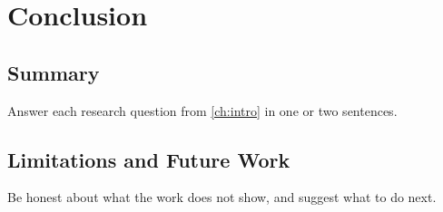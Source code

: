 \chapter{Conclusion}\label{ch:conclusion}

\section{Summary}
Answer each research question from \cref{ch:intro} in one or two sentences.

\section{Limitations and Future Work}
Be honest about what the work does not show, and suggest what to do next.
